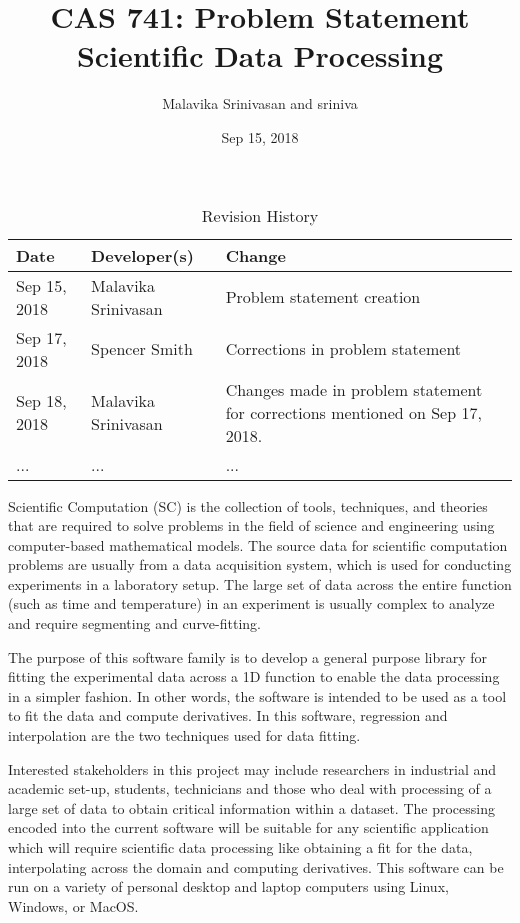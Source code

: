 \documentclass{article}
\title{CAS 741: Problem Statement\\ Scientific Data Processing}
\author{Malavika Srinivasan and sriniva}
\date{Sep 15, 2018}
\begin{document}
\maketitle

\begin{table}[hp]
\caption{Revision History} \label{TblRevisionHistory}
\begin{tabularx}{\textwidth}{llX}
\toprule
\textbf{Date} & \textbf{Developer(s)} & \textbf{Change}\\
\midrule
Sep 15, 2018 & Malavika Srinivasan & Problem statement creation\\
Sep 17, 2018 & Spencer Smith & Corrections in problem statement\\
Sep 18, 2018 & Malavika Srinivasan & 
Changes made in problem statement for corrections mentioned on Sep 17, 2018.\\
... & ... & ...\\
\bottomrule
\end{tabularx}
\end{table}

Scientific Computation (SC) is the collection of tools, techniques, and
theories that are required to solve problems in the field of science and
engineering using computer-based mathematical models. The source data for
scientific computation problems are usually 
from a data acquisition system, 
 
which is used for conducting experiments in a laboratory setup. The large set
of data across the entire function (such as time and temperature) in an
experiment is usually complex to analyze and require segmenting and
curve-fitting.

The purpose of this software family is to 
develop a general purpose library  for fitting the 
experimental data across a 1D function to enable the data processing in a simpler
fashion. In other words, the software is intended to be used as a tool to fit the data and compute
derivatives. 
In this software, regression and interpolation are the two techniques used for
data fitting.

Interested stakeholders in this project may include researchers in industrial
and academic set-up, students, technicians and those who deal with processing of
a large set of data to obtain critical information within a dataset. The
processing encoded into the current software will be suitable for any scientific
application which will require scientific data processing like obtaining a fit
for the data, interpolating across the domain and computing derivatives.  This software can be run on a variety of
personal desktop and laptop computers using Linux, Windows, or MacOS.





\end{document}
